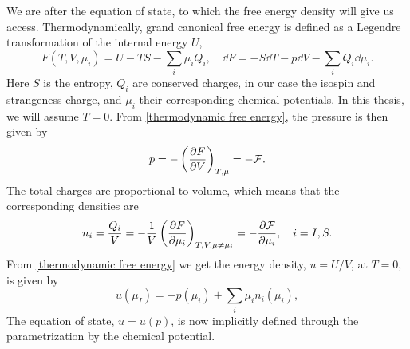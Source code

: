 We are after the equation of state, to which the free energy density will give us access.
Thermodynamically, grand canonical free energy is defined as a Legendre transformation of the internal energy $U$,
%
\begin{equation}
    \label{thermodynamic free energy}
    F(T, V, \mu_i) = U - TS - {\sum}_i \mu_i Q_i, 
    \quad \dd 
    F = - S \dd T - p \dd V - {\sum}_i Q_i \dd \mu_i.
\end{equation}
%
Here $S$ is the entropy, $Q_i$ are conserved charges, in our case the isospin and strangeness charge, and $\mu_i$ their corresponding chemical potentials.
In this thesis, we will assume $T = 0$.
From \autoref{thermodynamic free energy}, the pressure is then given by
%
\begin{equation}
    \label{pressure form free energy}
    p = - \left(\pdv{F}{V}\right)_{T, \mu} = - \mathcal{F}.
\end{equation}
%
The total charges are proportional to volume, which means that the corresponding densities are
%
\begin{equation}
    n_i = \frac{Q_i}{V} = - \frac{1}{V} \left(\pdv{F}{\mu_i}\right)_{T, V,\mu\neq\mu_i}
    = - \pdv{\mathcal{F}}{\mu_i}, \quad i = I, S.
\end{equation}
%
From \autoref{thermodynamic free energy} we get the energy density, $u = U/V$, at $T = 0$, is given by
%
\begin{equation}
    \label{energy density form pressure and isospin}
    u(\mu_I) = -p(\mu_i) + {\sum }_i\mu_i n_i(\mu_i),
\end{equation}
%
The equation of state, $u = u(p)$, is now implicitly defined through the parametrization by the chemical potential.


